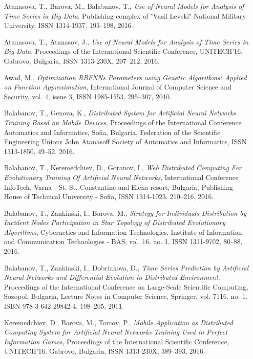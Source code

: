 \documentclass{llncs}
\begin{document}
\begin{thebibliography}{99}

 Atanasova, T., Barova, M., Balabanov, T., \textit{Use of Neural Models for Analysis of Time Series in Big Data}, Publishing complex of "Vasil Levski" National Military University, ISSN 1314-1937, 193--198, 2016.

 Atanasova, T., Atanasov, J., \textit{Use of Neural Models for Analysis of Time Series in Big Data}, Proceedings of the International Scientific Conference, UNITECH’16, Gabrovo, Bulgaria, ISSN 1313-230X,  207--212, 2016.

 Awad, M., \textit{Optimization RBFNNs Parameters using Genetic Algorithms: Applied on Function Approximation}, International Journal of Computer Science and Security, vol. 4, issue 3, ISSN 1985-1553, 295--307, 2010.

 Balabanov, T., Genova, K., \textit{Distributed System for Artificial Neural Networks Training Based on Mobile Devices}, Proceedings of the International Conference Automatics and Informatics, Sofia, Bulgaria, Federation of the Scientific Engineering Unions John Atanasoff Society of Automatics and Informatics, ISSN 1313-1850, 49--52, 2016.

 Balabanov, T., Keremedchiev, D., Goranov, I., \textit{Web Distributed Computing For Evolutionary Training Of Artificial Neural Networks}, International Conference InfoTech, Varna - St. St. Constantine and Elena resort, Bulgaria, Publishing House of Technical University - Sofia, ISSN 1314-1023, 210--216, 2016.

 Balabanov, T., Zankinski, I., Barova, M., \textit{Strategy for Individuals Distribution by Incident Nodes Participation in Star Topology of Distributed Evolutionary Algorithms}, Cybernetics and Information Technologies, Institute of Information and Communication Technologies - BAS, vol. 16, no. 1, ISSN 1311-9702, 80--88, 2016.

 Balabanov, T., Zankinski, I., Dobrinkova, D., \textit{Time Series Prediction by Artificial Neural Networks and Differential Evolution in Distributed Environment}. Proceedings of the International Conference on Large-Scale Scientific Computing, Sozopol, Bulgaria, Lecture Notes in Computer Science, Springer, vol. 7116, no. 1, ISBN 978-3-642-29842-4, 198–205, 2011. 

 Keremedchiev, D., Barova, M., Tomov, P., \textit{Mobile Application as Distributed Computing System for Artificial Neural Networks Training Used in Perfect Information Games}, Proceedings of the International Scientific Conference, UNITECH’16, Gabrovo, Bulgaria, ISSN 1313-230X, 389--393, 2016.


\end{thebibliography}
\end{document}
